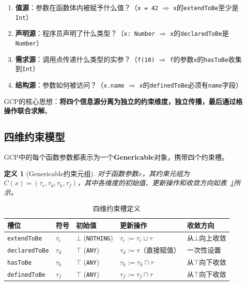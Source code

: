 \documentclass[UTF8]{article}
\newtheorem{definition}[theorem]{定义}
\begin{document}
\begin{enumerate}[leftmargin=2em]
\item \textbf{值源}：参数在函数体内被赋予什么值？（\texttt{x = 42} $\Rightarrow$ \texttt{x}的\texttt{extendToBe}至少是\texttt{Int}）
\item \textbf{声明源}：程序员声明了什么类型？（\texttt{x: Number} $\Rightarrow$ \texttt{x}的\texttt{declaredToBe}是\texttt{Number}）
\item \textbf{需求源}：调用点传递什么类型的实参？（\texttt{f(10)} $\Rightarrow$ \texttt{f}的参数\texttt{x}的\texttt{hasToBe}收集到\texttt{Int}）
\item \textbf{结构源}：参数如何被访问？（\texttt{x.name} $\Rightarrow$ \texttt{x}的\texttt{definedToBe}必须有\texttt{name}字段）
\end{enumerate}

GCP的核心思想：\textbf{将四个信息源分离为独立的约束维度，独立传播，最后通过格操作联合求解}。

\subsection{四维约束模型}
\label{sec:model}

GCP中的每个函数参数都表示为一个\textbf{Genericable}对象，携带四个约束槽。

\begin{definition}[Genericable约束元组]
对于函数参数$x$，其约束元组为 $C(x) = (\tau_e, \tau_d, \tau_h, \tau_f)$，其中各维度的初始值、更新操作和收敛方向如表~\ref{tab:constraints}所示。
\end{definition}

\begin{table}[h]
\centering
\caption{四维约束槽定义}
\label{tab:constraints}
\begin{tabular}{lllll}
\toprule
\textbf{槽位} & \textbf{符号} & \textbf{初始值} & \textbf{更新操作} & \textbf{收敛方向} \\
\midrule
\texttt{extendToBe}  & $\tau_e$ & $\bot$ (\texttt{NOTHING}) & $\tau_e := \tau_e \sqcup \tau$ & 从$\bot$向上收敛 \\
\texttt{declaredToBe} & $\tau_d$ & $\top$ (\texttt{ANY})     & $\tau_d := \tau$（直接赋值）   & 一次性设置 \\
\texttt{hasToBe}     & $\tau_h$ & $\top$ (\texttt{ANY})     & $\tau_h := \tau_h \sqcap \tau$ & 从$\top$向下收敛 \\
\texttt{definedToBe} & $\tau_f$ & $\top$ (\texttt{ANY})     & $\tau_f := \tau_f \sqcap \tau$ & 从$\top$向下收敛 \\
\bottomrule
\end{tabular}
\end{table}
\end{document}
